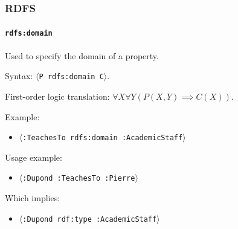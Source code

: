 \documentclass{beamer}
\newcommand{\triplet}[1]{$\langle$\texttt{#1}$\rangle$}
\begin{document}
\begin{frame}
  \frametitle{RDFS}
  \framesubtitle{\texttt{rdfs:domain}}

  Used to specify the domain of a property.

  \pause

  \bigskip

  Syntax: \triplet{P rdfs:domain C}.

  \pause

  \medskip

  First-order logic translation: $\forall X \forall Y (P(X, Y) \implies C(X))$.

  \pause

  \bigskip

  Example:

  \begin{itemize}
    \item \triplet{:TeachesTo rdfs:domain :AcademicStaff}
  \end{itemize}

  \pause

  Usage example:

  \begin{itemize}
    \item \triplet{:Dupond :TeachesTo :Pierre}
  \end{itemize}

  \pause

  Which implies:

  \begin{itemize}
    \item \triplet{:Dupond rdf:type :AcademicStaff}
  \end{itemize}
\end{frame}
\end{document}
